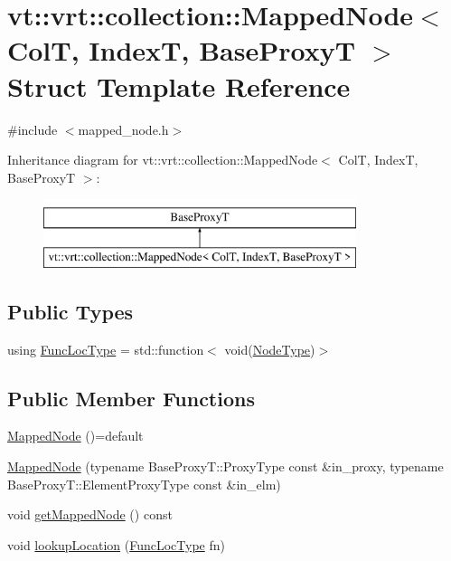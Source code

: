 \hypertarget{structvt_1_1vrt_1_1collection_1_1_mapped_node}{}\section{vt\+:\+:vrt\+:\+:collection\+:\+:Mapped\+Node$<$ ColT, IndexT, Base\+ProxyT $>$ Struct Template Reference}
\label{structvt_1_1vrt_1_1collection_1_1_mapped_node}


{\ttfamily \#include $<$mapped\+\_\+node.\+h$>$}

Inheritance diagram for vt\+:\+:vrt\+:\+:collection\+:\+:Mapped\+Node$<$ ColT, IndexT, Base\+ProxyT $>$\+:\begin{figure}[H]
\begin{center}
\leavevmode
\includegraphics[height=2.000000cm]{structvt_1_1vrt_1_1collection_1_1_mapped_node}
\end{center}
\end{figure}
\subsection*{Public Types}
\begin{DoxyCompactItemize}
\item 
using \hyperlink{structvt_1_1vrt_1_1collection_1_1_mapped_node_af08e7287d3adf47dfca1e4184b82d060}{Func\+Loc\+Type} = std\+::function$<$ void(\hyperlink{namespacevt_a866da9d0efc19c0a1ce79e9e492f47e2}{Node\+Type})$>$
\end{DoxyCompactItemize}
\subsection*{Public Member Functions}
\begin{DoxyCompactItemize}
\item 
\hyperlink{structvt_1_1vrt_1_1collection_1_1_mapped_node_a0f996a3267a2e23a946e9696ba9db8a5}{Mapped\+Node} ()=default
\item 
\hyperlink{structvt_1_1vrt_1_1collection_1_1_mapped_node_af4c4a7b812aafea44d727c3901bf3f85}{Mapped\+Node} (typename Base\+Proxy\+T\+::\+Proxy\+Type const \&in\+\_\+proxy, typename Base\+Proxy\+T\+::\+Element\+Proxy\+Type const \&in\+\_\+elm)
\item 
void \hyperlink{structvt_1_1vrt_1_1collection_1_1_mapped_node_a06312fd72cdc20a1b9671846426ec571}{get\+Mapped\+Node} () const
\item 
void \hyperlink{structvt_1_1vrt_1_1collection_1_1_mapped_node_a881a52cad96b7fb7754da0fa7dbe3c98}{lookup\+Location} (\hyperlink{structvt_1_1vrt_1_1collection_1_1_mapped_node_af08e7287d3adf47dfca1e4184b82d060}{Func\+Loc\+Type} fn)
\end{DoxyCompactItemize}



